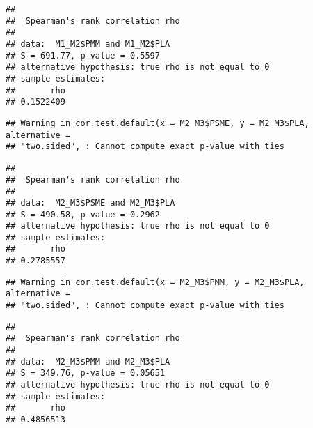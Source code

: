 \documentclass[]{article}
\newenvironment{Shaded}{\begin{snugshade}}{\end{snugshade}}
\newcommand{\KeywordTok}[1]{\textcolor[rgb]{0.13,0.29,0.53}{\textbf{{#1}}}}
\newcommand{\DataTypeTok}[1]{\textcolor[rgb]{0.13,0.29,0.53}{{#1}}}
\newcommand{\StringTok}[1]{\textcolor[rgb]{0.31,0.60,0.02}{{#1}}}
\newcommand{\CommentTok}[1]{\textcolor[rgb]{0.56,0.35,0.01}{\textit{{#1}}}}
\newcommand{\OtherTok}[1]{\textcolor[rgb]{0.56,0.35,0.01}{{#1}}}
\newcommand{\NormalTok}[1]{{#1}}
\begin{document}
\begin{verbatim}
## 
##  Spearman's rank correlation rho
## 
## data:  M1_M2$PMM and M1_M2$PLA
## S = 691.77, p-value = 0.5597
## alternative hypothesis: true rho is not equal to 0
## sample estimates:
##       rho 
## 0.1522409
\end{verbatim}

\begin{Shaded}
\end{Shaded}

\begin{verbatim}
## Warning in cor.test.default(x = M2_M3$PSME, y = M2_M3$PLA, alternative =
## "two.sided", : Cannot compute exact p-value with ties
\end{verbatim}

\begin{verbatim}
## 
##  Spearman's rank correlation rho
## 
## data:  M2_M3$PSME and M2_M3$PLA
## S = 490.58, p-value = 0.2962
## alternative hypothesis: true rho is not equal to 0
## sample estimates:
##       rho 
## 0.2785557
\end{verbatim}

\begin{Shaded}
\end{Shaded}

\begin{verbatim}
## Warning in cor.test.default(x = M2_M3$PMM, y = M2_M3$PLA, alternative =
## "two.sided", : Cannot compute exact p-value with ties
\end{verbatim}

\begin{verbatim}
## 
##  Spearman's rank correlation rho
## 
## data:  M2_M3$PMM and M2_M3$PLA
## S = 349.76, p-value = 0.05651
## alternative hypothesis: true rho is not equal to 0
## sample estimates:
##       rho 
## 0.4856513
\end{verbatim}
\end{document}
